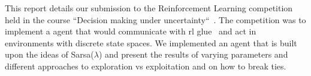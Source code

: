 This report details our submission to the Reinforcement Learning competition held in the course ``Decision making under uncertainty``~\cite{decmaking}. The competition was to implement a agent that would communicate with rl glue~\cite{rl-glue} and act in environments with discrete state spaces.
We implemented an agent that is built upon the ideas of Sarsa($\lambda$) and present the results of varying parameters and different approaches to exploration vs exploitation and on how to break ties.